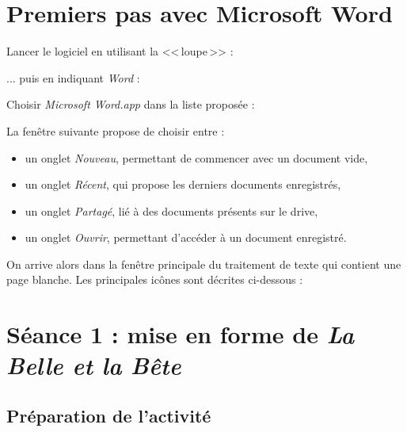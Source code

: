 \section{Premiers pas avec Microsoft Word}

Lancer le logiciel en utilisant la <<\,loupe\,>> :


... puis en indiquant \emph{Word} :


Choisir \emph{Microsoft Word.app} dans la liste proposée :


La fenêtre suivante propose de choisir entre :
\begin{itemize}
\item un onglet \emph{Nouveau}, permettant de commencer avec un document vide,
\item un onglet \emph{Récent}, qui propose les derniers documents enregistrés,
\item un onglet \emph{Partagé}, lié à des documents présents sur le drive,
\item un onglet \emph{Ouvrir}, permettant d'accéder à un document enregistré.
\end{itemize}


On arrive alors dans la fenêtre principale du traitement de texte qui contient une page blanche. Les principales icônes sont décrites ci-dessous :





%
%
%
%




\section{Séance 1 : mise en forme de \emph{La Belle et la Bête}}

\subsection{Préparation de l'activité}

